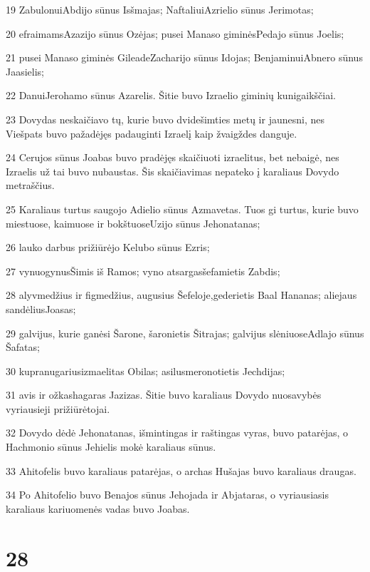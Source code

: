 \par 19 Zabulonui­Abdijo sūnus Isšmajas; Naftaliui­Azrielio sūnus Jerimotas; 
\par 20 efraimams­Azazijo sūnus Ozėjas; pusei Manaso giminės­Pedajo sūnus Joelis; 
\par 21 pusei Manaso giminės Gileade­Zacharijo sūnus Idojas; Benjaminui­Abnero sūnus Jaasielis; 
\par 22 Danui­Jerohamo sūnus Azarelis. Šitie buvo Izraelio giminių kunigaikščiai. 
\par 23 Dovydas neskaičiavo tų, kurie buvo dvidešimties metų ir jaunesni, nes Viešpats buvo pažadėjęs padauginti Izraelį kaip žvaigždes danguje. 
\par 24 Cerujos sūnus Joabas buvo pradėjęs skaičiuoti izraelitus, bet nebaigė, nes Izraelis už tai buvo nubaustas. Šis skaičiavimas nepateko į karaliaus Dovydo metraščius. 
\par 25 Karaliaus turtus saugojo Adielio sūnus Azmavetas. Tuos gi turtus, kurie buvo miestuose, kaimuose ir bokštuose­Uzijo sūnus Jehonatanas; 
\par 26 lauko darbus prižiūrėjo Kelubo sūnus Ezris; 
\par 27 vynuogynus­Šimis iš Ramos; vyno atsargas­šefamietis Zabdis; 
\par 28 alyvmedžius ir figmedžius, augusius Šefeloje,­gederietis Baal Hananas; aliejaus sandėlius­Joasas; 
\par 29 galvijus, kurie ganėsi Šarone,­ šaronietis Šitrajas; galvijus slėniuose­Adlajo sūnus Šafatas; 
\par 30 kupranugarius­izmaelitas Obilas; asilus­meronotietis Jechdijas; 
\par 31 avis ir ožkas­hagaras Jazizas. Šitie buvo karaliaus Dovydo nuosavybės vyriausieji prižiūrėtojai. 
\par 32 Dovydo dėdė Jehonatanas, išmintingas ir raštingas vyras, buvo patarėjas, o Hachmonio sūnus Jehielis mokė karaliaus sūnus. 
\par 33 Ahitofelis buvo karaliaus patarėjas, o archas Hušajas buvo karaliaus draugas. 
\par 34 Po Ahitofelio buvo Benajos sūnus Jehojada ir Abjataras, o vyriausiasis karaliaus kariuomenės vadas buvo Joabas.



\chapter{28}

